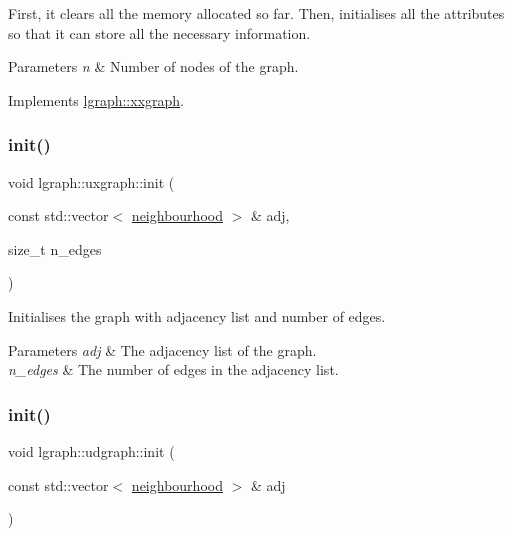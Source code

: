 First, it clears all the memory allocated so far. Then, initialises all the attributes so that it can store all the necessary information.


\begin{DoxyParams}{Parameters}
{\em n} & Number of nodes of the graph. \\
\hline
\end{DoxyParams}


Implements \hyperlink{classlgraph_1_1xxgraph_aba97900b2d33e1bb0d31594cf169f0ba}{lgraph\+::xxgraph}.

\mbox{\label{classlgraph_1_1uxgraph_ab0e84975aa8048e6d93622d1b4e0c567}} 
\subsubsection{\texorpdfstring{init()}{init()}\hspace{0.1cm}{\footnotesize\ttfamily [2/3]}}
{\footnotesize\ttfamily void lgraph\+::uxgraph\+::init (\begin{DoxyParamCaption}\item[{const std\+::vector$<$ \hyperlink{namespacelgraph_a052e7766c13f3a43cec0aec8173fdede}{neighbourhood} $>$ \&}]{adj,  }\item[{size\+\_\+t}]{n\+\_\+edges }\end{DoxyParamCaption})\hspace{0.3cm}{\ttfamily [inherited]}}



Initialises the graph with adjacency list and number of edges. 


\begin{DoxyParams}{Parameters}
{\em adj} & The adjacency list of the graph. \\
\hline
{\em n\+\_\+edges} & The number of edges in the adjacency list. \\
\hline
\end{DoxyParams}
\mbox{\label{classlgraph_1_1udgraph_a7f3cb28fb43c4002b41188ac8fd81d52}} 
\subsubsection{\texorpdfstring{init()}{init()}\hspace{0.1cm}{\footnotesize\ttfamily [3/3]}}
{\footnotesize\ttfamily void lgraph\+::udgraph\+::init (\begin{DoxyParamCaption}\item[{const std\+::vector$<$ \hyperlink{namespacelgraph_a052e7766c13f3a43cec0aec8173fdede}{neighbourhood} $>$ \&}]{adj }\end{DoxyParamCaption})}



